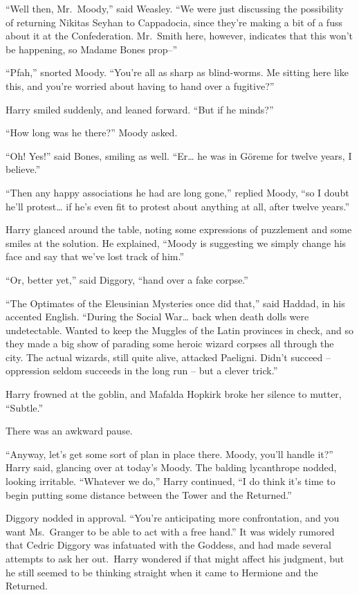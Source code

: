 ``Well then, Mr.~Moody,'' said Weasley. ``We were just discussing the
possibility of returning Nikitas Seyhan to Cappadocia, since they're
making a bit of a fuss about it at the Confederation. Mr.~Smith here,
however, indicates that this won't be happening, so Madame Bones
prop--''

``Pfah,'' snorted Moody. ``You're all as sharp as blind-worms. Me
sitting here like this, and you're worried about having to hand over a
fugitive?''

Harry smiled suddenly, and leaned forward. ``But if he minds?''

``How long was he there?'' Moody asked.

``Oh! Yes!'' said Bones, smiling as well. ``Er\ldots{} he was in Göreme
for twelve years, I believe.''

``Then any happy associations he had are long gone,'' replied Moody,
``so I doubt he'll protest\ldots{} if he's even fit to protest about
anything at all, after twelve years.''

Harry glanced around the table, noting some expressions of puzzlement
and some smiles at the solution. He explained, ``Moody is suggesting we
simply change his face and say that we've lost track of him.''

``Or, better yet,'' said Diggory, ``hand over a fake corpse.''

``The Optimates of the Eleusinian Mysteries once did that,'' said
Haddad, in his accented English. ``During the Social War\ldots{} back
when death dolls were undetectable. Wanted to keep the Muggles of the
Latin provinces in check, and so they made a big show of parading some
heroic wizard corpses all through the city. The actual wizards, still
quite alive, attacked Paeligni. Didn't succeed -- oppression seldom
succeeds in the long run -- but a clever trick.''

Harry frowned at the goblin, and Mafalda Hopkirk broke her silence to
mutter, ``Subtle.''

There was an awkward pause.

``Anyway, let's get some sort of plan in place there. Moody, you'll
handle it?'' Harry said, glancing over at today's Moody. The balding
lycanthrope nodded, looking irritable. ``Whatever we do,'' Harry
continued, ``I do think it's time to begin putting some distance between
the Tower and the Returned.''

Diggory nodded in approval. ``You're anticipating more confrontation,
and you want Ms.~Granger to be able to act with a free hand.'' It was
widely rumored that Cedric Diggory was infatuated with the Goddess, and
had made several attempts to ask her out.~Harry wondered if that might
affect his judgment, but he still seemed to be thinking straight when it
came to Hermione and the Returned.

